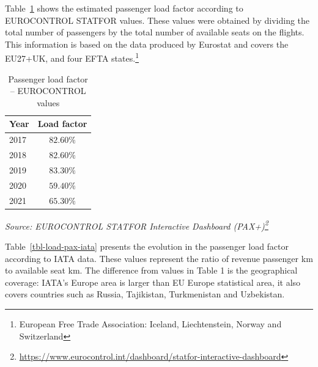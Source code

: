 \documentclass[
  11pt,
  a4paper,
]{book}
\DeclareRobustCommand{\href}[2]{#2\footnote{\url{#1}}}
\begin{document}
Table~\ref{tbl-load-pax-statfor} shows the estimated passenger load
factor according to EUROCONTROL STATFOR values. These values were
obtained by dividing the total number of passengers by the total number
of available seats on the flights. This information is based on the data
produced by Eurostat and covers the EU27+UK, and four EFTA
states.\footnote{European Free Trade Association: Iceland,
  Liechtenstein, Norway and Switzerland}

\hypertarget{tbl-load-pax-statfor}{}
\setlength{\LTpost}{0mm}
\begin{longtable}{lc}
\caption{\label{tbl-load-pax-statfor}Passenger load factor -- EUROCONTROL values }\tabularnewline

\toprule
Year & Load factor \\ 
\midrule
2017 & $82.60\%$ \\ 
2018 & $82.60\%$ \\ 
2019 & $83.30\%$ \\ 
2020 & $59.40\%$ \\ 
2021 & $65.30\%$ \\ 
\bottomrule
\end{longtable}
\begin{minipage}{\linewidth}
\emph{Source: \href{https://www.eurocontrol.int/dashboard/statfor-interactive-dashboard}{EUROCONTROL STATFOR Interactive Dashboard (PAX+)}}\\
\end{minipage}

Table~\ref{tbl-load-pax-iata} presents the evolution in the passenger
load factor according to IATA data. These values represent the ratio of
revenue passenger km to available seat km. The difference from values in
Table 1 is the geographical coverage: IATA's Europe area is larger than
EU Europe statistical area, it also covers countries such as Russia,
Tajikistan, Turkmenistan and Uzbekistan.
\end{document}
